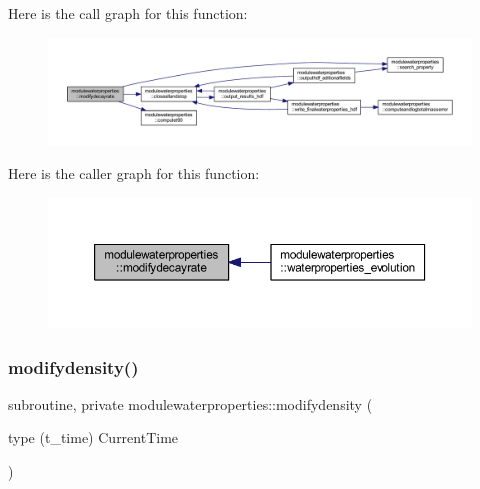 Here is the call graph for this function\+:\nopagebreak
\begin{figure}[H]
\begin{center}
\leavevmode
\includegraphics[width=350pt]{namespacemodulewaterproperties_a5d19c5c0edd1b4706080cd0259456cd8_cgraph}
\end{center}
\end{figure}
Here is the caller graph for this function\+:\nopagebreak
\begin{figure}[H]
\begin{center}
\leavevmode
\includegraphics[width=350pt]{namespacemodulewaterproperties_a5d19c5c0edd1b4706080cd0259456cd8_icgraph}
\end{center}
\end{figure}
\mbox{\label{namespacemodulewaterproperties_a7727e3b2ffd1b7f1c501dc60cf64c723}} 
\subsubsection{\texorpdfstring{modifydensity()}{modifydensity()}}
{\footnotesize\ttfamily subroutine, private modulewaterproperties\+::modifydensity (\begin{DoxyParamCaption}\item[{type (t\+\_\+time)}]{Current\+Time }\end{DoxyParamCaption})\hspace{0.3cm}{\ttfamily [private]}}


